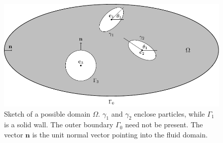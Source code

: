 \documentclass[preprint, 10pt]{elsarticle}
\begin{document}
\begin{figure}[!h]
\begin{center}
\includegraphics{figures/multiply_connected.pdf}
\end{center}
\caption{\label{fig:geomSchematic}Sketch of a possible domain $\Omega$.
  $\gamma_1$ and $\gamma_2$ enclose particles, while $\Gamma_1$ is a
  solid wall. The outer boundary $\Gamma_0$ need not be present.  The
  vector $\mathbf{n}$ is the unit normal vector pointing into the fluid
  domain.}
\end{figure}
\end{document}
